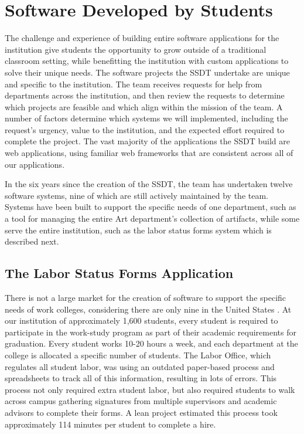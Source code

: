 \section{Software Developed by Students}

The challenge and experience of building entire software applications for the institution give students the opportunity to grow outside of a traditional classroom setting, while benefitting the institution with custom applications to solve their unique needs. The software projects the SSDT undertake are unique and specific to the institution. The team receives requests for help from departments across the institution, and then review the requests to determine which projects are feasible and which align within the mission of the team. A number of factors determine which systems we will implemented, including the request’s urgency, value to the institution, and the expected effort required to complete the project. The vast majority of the applications the SSDT build are web applications, using familiar web frameworks that are consistent across all of our applications.

In the six years since the creation of the SSDT, the team has undertaken twelve software systems, nine of which are still actively maintained by the team. Systems have been built to support the specific needs of one department, such as a tool for managing the entire Art department's collection of artifacts, while some serve the entire institution, such as the labor status forms system which is described next.

\subsection{The Labor Status Forms Application}
There is not a large market for the creation of software to support the specific needs of work colleges, considering there are only nine in the United States \cite{WCCMembers, Ecclesia}. At our institution of approximately 1,600 students, every student is required to participate in the work-study program as part of their academic requirements for graduation. Every student works 10-20 hours a week, and each department at the college is allocated a specific number of students. The Labor Office, which regulates all student labor, was using an outdated paper-based process and spreadsheets to track all of this information, resulting in lots of errors. This process not only required extra student labor, but also required students to walk across campus gathering signatures from multiple supervisors and academic advisors to complete their forms. A lean project estimated this process took approximately 114 minutes per student to complete a hire.

